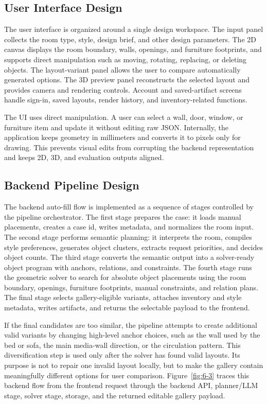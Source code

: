 \subsection{User Interface Design}\label{subsec:user-interface-design}

The user interface is organized around a single design workspace. The input panel collects the room type, style, design brief, and other design parameters. The 2D canvas displays the room boundary, walls, openings, and furniture footprints, and supports direct manipulation such as moving, rotating, replacing, or deleting objects. The layout-variant panel allows the user to compare automatically generated options. The 3D preview panel reconstructs the selected layout and provides camera and rendering controls. Account and saved-artifact screens handle sign-in, saved layouts, render history, and inventory-related functions.

The UI uses direct manipulation. A user can select a wall, door, window, or furniture item and update it without editing raw JSON. Internally, the application keeps geometry in millimeters and converts it to pixels only for drawing. This prevents visual edits from corrupting the backend representation and keeps 2D, 3D, and evaluation outputs aligned.

\subsection{Backend Pipeline Design}\label{subsec:backend-pipeline-design}

The backend auto-fill flow is implemented as a sequence of stages controlled by the pipeline orchestrator. The first stage prepares the case: it loads manual placements, creates a case id, writes metadata, and normalizes the room input. The second stage performs semantic planning: it interprets the room, compiles style preferences, generates object clusters, extracts request priorities, and decides object counts. The third stage converts the semantic output into a solver-ready object program with anchors, relations, and constraints. The fourth stage runs the geometric solver to search for absolute object placements using the room boundary, openings, furniture footprints, manual constraints, and relation plans. The final stage selects gallery-eligible variants, attaches inventory and style metadata, writes artifacts, and returns the selectable payload to the frontend.

If the final candidates are too similar, the pipeline attempts to create additional valid variants by changing high-level anchor choices, such as the wall used by the bed or sofa, the main media-wall direction, or the circulation pattern. This diversification step is used only after the solver has found valid layouts. Its purpose is not to repair one invalid layout locally, but to make the gallery contain meaningfully different options for user comparison. Figure~\ref{fig:6-3} traces this backend flow from the frontend request through the backend API, planner/LLM stage, solver stage, storage, and the returned editable gallery payload.

